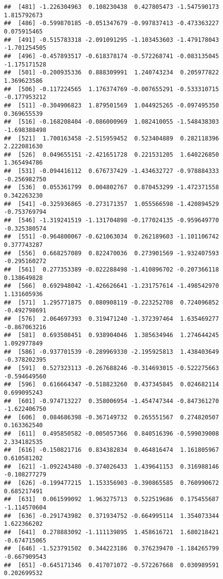 \documentclass[
]{article}
\begin{document}
\begin{verbatim}
##  [481] -1.226304963  0.108230438  0.427805473 -1.547590173  1.815792673
##  [486] -0.599870185 -0.051347679 -0.997837413 -0.473363227  0.075915465
##  [491] -0.515783318 -2.091091295 -1.103453603 -1.479178043 -1.701254505
##  [496] -0.457893517 -0.618378174 -0.572268741 -0.083135045 -1.175171528
##  [501] -0.200935336  0.888309991  1.240743234  0.205977822  1.369623586
##  [506] -0.117224565  1.176374769 -0.007655291 -0.533310715 -0.177953212
##  [511] -0.304906823  1.879501569  1.044925265 -0.097495350  0.369655539
##  [516] -0.168208404 -0.086000969  1.082410055 -1.548438303 -1.698388498
##  [521]  1.700163458 -2.515959452  0.523404889  0.282118396  2.222081630
##  [526]  0.049655151 -2.421651728  0.221531205  1.640226850  1.365494786
##  [531] -0.094416112  0.676737429 -1.434632727 -0.978884333 -0.256982750
##  [536]  0.055361799  0.004802767  0.870453299 -1.472371558  0.342263230
##  [541] -0.325936865 -0.273171357  1.055566598 -1.420894529 -0.753769794
##  [546] -1.319241519 -1.131704898 -0.177024135 -0.959649770 -0.325380574
##  [551] -0.964800067 -0.621063034  0.262189603 -1.101106742  0.377743287
##  [556]  0.668257089  0.822470036  0.273901569 -1.932407593 -0.295160272
##  [561]  0.277353389 -0.022288498 -1.410896702 -0.207366118  0.138649828
##  [566]  0.692948042 -1.426626641 -1.231757614 -1.498542970  1.131605936
##  [571]  1.295771875  0.080908119 -0.223252708  0.724096852 -0.492798691
##  [576]  2.064697393  0.319471240 -1.372397464  1.635469277 -0.867063216
##  [581]  0.693508451  0.938904046  1.385634946  1.274644245  1.092977849
##  [586] -0.937701539 -0.289969330 -2.195925813  1.438403649 -0.378202395
##  [591]  0.527323113 -0.267688246 -0.314693015 -0.522275663 -0.594649560
##  [596]  0.616664347 -0.518823260  0.437345845  0.024682114  0.699095243
##  [601] -0.974713227  0.358006954 -1.454747344 -0.847361270 -1.622406750
##  [606]  0.084686398 -0.367149732  0.265551567  0.274820507  0.163362540
##  [611]  0.495850582 -0.005057366  0.840516396 -0.599039008  2.334182535
##  [616] -0.150821716  0.834382834  0.464816474  1.161805967  0.610581202
##  [621] -1.092243480 -0.374026433  1.439641153  0.316988146 -0.108277279
##  [626] -0.199477215  1.153356903 -0.390865585  0.760990672  0.685217491
##  [631]  0.061599092  1.963275713  0.522519686  0.175455687 -1.114570604
##  [636] -0.291743982  0.371934752 -0.664995114  1.354073344  1.622366202
##  [641]  0.278883092 -1.111139895  1.458616721  1.680218421 -0.674715065
##  [646] -1.523791502  0.344223186  0.376239470 -1.184265799 -0.667909543
##  [651] -0.645171346  0.417071072 -0.572267668  0.030989591  0.202699532

\end{verbatim}
\end{document}
